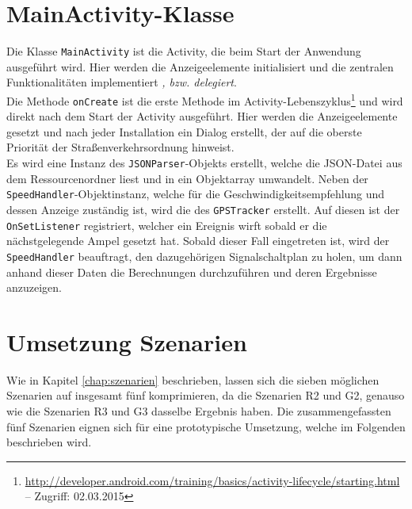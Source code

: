 \section{MainActivity-Klasse}
Die Klasse \texttt{MainActivity} ist die \gls{Activity}, die beim Start der Anwendung ausgeführt wird.  Hier werden die Anzeigeelemente initialisiert und die zentralen Funktionalitäten implementiert \textit{, bzw. delegiert}.\\
Die Methode \texttt{onCreate} ist die erste Methode im \gls{Activity}-Lebenszyklus\footnote{ \url{http://developer.android.com/training/basics/activity-lifecycle/starting.html} -- Zugriff: 02.03.2015} und wird direkt nach dem Start der \gls{Activity} ausgeführt. Hier werden die Anzeigeelemente gesetzt und nach jeder Installation ein Dialog erstellt, der auf die oberste Priorität der Straßenverkehrsordnung hinweist.\\
Es wird eine Instanz des \texttt{JSONParser}-Objekts erstellt, welche die \gls{JSON}-Datei aus dem Ressourcenordner liest und in ein Objektarray umwandelt. Neben der \texttt{SpeedHandler}-Objektinstanz, welche für die Geschwindigkeitsempfehlung und dessen Anzeige zuständig ist, wird die des \texttt{GPSTracker} erstellt. Auf diesen ist der \texttt{OnSetListener} registriert, welcher ein Ereignis wirft sobald er die nächstgelegende Ampel gesetzt hat. Sobald dieser Fall eingetreten ist, wird der \texttt{SpeedHandler} beauftragt, den dazugehörigen Signalschaltplan zu holen, um dann anhand dieser Daten die Berechnungen durchzuführen und deren Ergebnisse anzuzeigen.   
%
%
\section{Umsetzung Szenarien}
Wie in Kapitel \ref{chap:szenarien} beschrieben, lassen sich die sieben möglichen Szenarien auf insgesamt fünf komprimieren, da die Szenarien R2 und G2, genauso wie die Szenarien R3 und G3 dasselbe Ergebnis haben. Die zusammengefassten fünf Szenarien eignen sich für eine prototypische Umsetzung, welche im Folgenden beschrieben wird.
